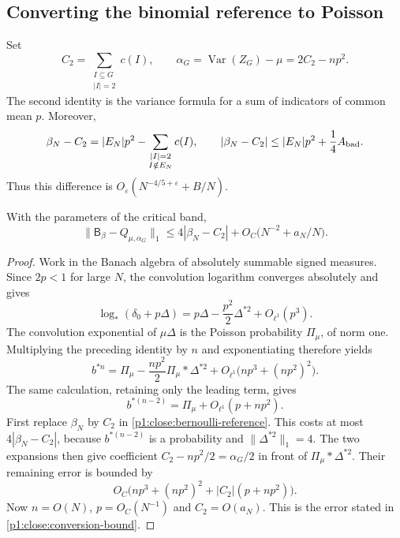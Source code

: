 \subsection{Converting the binomial reference to Poisson}

Set
\begin{equation}
 C_2=\sum_{\substack{I\subseteq G\\|I|=2}}c(I),
 \qquad
 \alpha_G=\operatorname{Var}(Z_G)-\mu=2C_2-np^2.
 \label{p1:close:variance}
\end{equation}
The second identity is the variance formula for a sum of
indicators of common mean $p$.  Moreover,
\begin{equation}
 \beta_N-C_2
       =|E_N|p^2-\sum_{\substack{|I|=2\\I\notin E_N}}c(I),
 \qquad
 |\beta_N-C_2|
       \le |E_N|p^2+\frac14A_{\rm bad}.
 \label{p1:close:beta-covariance}
\end{equation}
Thus this difference is
$O_\varepsilon(N^{-4/5+\varepsilon}+B/N)$.

\begin{lemma}
\label{p1:close:conversion}
With the parameters of the critical band,
\begin{equation}
 \|\mathsf B_\beta-Q_{\mu,\alpha_G}\|_1
 \le 4|\beta_N-C_2|+
           O_C\bigl(N^{-2}+a_N/N\bigr).
 \label{p1:close:conversion-bound}
\end{equation}
\end{lemma}

\begin{proof}
Work in the Banach algebra of absolutely summable signed
measures.  Since $2p<1$ for large $N$, the convolution
logarithm converges absolutely and gives
\[
 \log_*(\delta_0+p\Delta)
     =p\Delta-\frac{p^2}{2}\Delta^{*2}
                     +O_{\ell^1}(p^3).
\]
The convolution exponential of $\mu\Delta$ is the Poisson
probability $\Pi_\mu$, of norm one.  Multiplying the preceding
identity by $n$ and exponentiating therefore yields
\begin{equation}
 b^{*n}
 =\Pi_\mu-\frac{np^2}{2}\Pi_\mu*\Delta^{*2}
           +O_{\ell^1}\bigl(np^3+(np^2)^2\bigr).
 \label{p1:close:binomial-expansion}
\end{equation}
The same calculation, retaining only the leading term, gives
\[
 b^{*(n-2)}
       =\Pi_\mu+O_{\ell^1}(p+np^2).
\]
First replace $\beta_N$ by $C_2$ in
\eqref{p1:close:bernoulli-reference}.
This costs at most $4|\beta_N-C_2|$, because
$b^{*(n-2)}$ is a probability and $\|\Delta^{*2}\|_1=4$.
The two expansions then give coefficient
$C_2-np^2/2=\alpha_G/2$ in front of
$\Pi_\mu*\Delta^{*2}$.  Their remaining error is bounded by
\[
 O_C\bigl(np^3+(np^2)^2+|C_2|(p+np^2)\bigr).
\]
Now $n=O(N)$, $p=O_C(N^{-1})$ and $C_2=O(a_N)$.
This is the error stated in \eqref{p1:close:conversion-bound}.
\end{proof}


